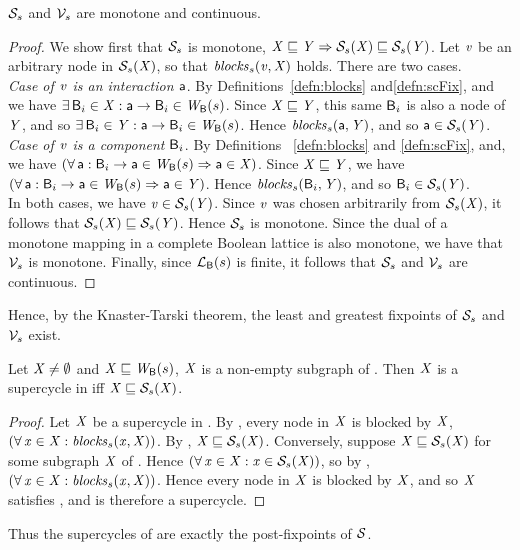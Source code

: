 \begin{proposition} \label{prop:monotone}
$\mathcal{S}_s$ and $\mathcal{V}_s$ are monotone and continuous.
\end{proposition}
%
\begin{proof}
We show first that $\mathcal{S}_s$ is monotone, \ie $\mathit{X} \sqsubseteq \mathit{Y} \Rightarrow \mathcal{S}_{s}(\mathit{X}) \sqsubseteq \mathcal{S}_{s}(\mathit{Y})$.
Let $\mathit{v}$ be an arbitrary node in $\mathcal{S}_{s}(\mathit{X})$, so that $\mathit{blocks}_{s}(\mathit{v}, \mathit{X})$ holds. There are two cases.\\

\emph{Case of $\mathit{v}$ is an interaction $\mathsf{a}$}. By Definitions~\ref{defn:blocks} and\ref{defn:scFix}, and  we have $\exists\, \mathsf{B}_i \in \mathit{X}  : \mathsf{a} \rightarrow \mathsf{B}_i \in \mathit{W}_{\mathsf{B}}({s})$.
Since $\mathit{X} \sqsubseteq \mathit{Y}$, this same $\mathsf{B}_i$ is also a node of $\mathit{Y}$, and so  $\exists\, \mathsf{B}_i \in \mathit{Y}  : \mathsf{a} \rightarrow \mathsf{B}_i \in \mathit{W}_{\mathsf{B}}({s})$. 
Hence  $\mathit{blocks}_{s}(\mathsf{a}, \mathit{Y})$, and so $\mathsf{a} \in \mathcal{S}_{s}(\mathit{Y})$. \\

\emph{Case of $\mathit{v}$ is a component $\mathsf{B}_i$}. By Definitions~ \ref{defn:blocks} and \ref{defn:scFix}, and, we have $(\forall\, \mathsf{a} : \mathsf{B}_i \rightarrow \mathsf{a} \in \mathit{W}_{\mathsf{B}}({s}) \Rightarrow \mathsf{a} \in \mathit{X})$.
Since $\mathit{X} \sqsubseteq \mathit{Y}$, we have  $(\forall\, \mathsf{a} : \mathsf{B}_i \rightarrow \mathsf{a} \in \mathit{W}_{\mathsf{B}}({s}) \Rightarrow \mathsf{a} \in \mathit{Y})$. 
Hence $\mathit{blocks}_{s}(\mathsf{B}_i, \mathit{Y})$, and so $\mathsf{B}_i \in \mathcal{S}_{s}(\mathit{Y})$. \\

In both cases, we have $\mathit{v} \in \mathcal{S}_{s}(\mathit{Y})$. Since $\mathit{v}$ was chosen arbitrarily from $\mathcal{S}_{s}(\mathit{X}) $, it follows that $\mathcal{S}_{s}(\mathit{X}) \sqsubseteq \mathcal{S}_{s}(\mathit{Y})$. Hence
$\mathcal{S}_s$ is monotone.
%
Since the dual of a monotone mapping in a complete Boolean lattice is also monotone, we have that $\mathcal{V}_s$ is monotone.
%
Finally, since $\mathcal{L}_{\mathsf{B}}({s})$ is finite, it follows that $\mathcal{S}_s$ and $\mathcal{V}_s$ are continuous.
\end{proof}

Hence, by the Knaster-Tarski theorem, the least and greatest fixpoints of $\mathcal{S}_s$ and $\mathcal{V}_s$ exist.

\begin{proposition} \label{prop:supercycleGFP}
Let $\mathit{X} \ne \emptyset$ and $\mathit{X} \sqsubseteq \mathit{W}_{\mathsf{B}}({s})$, \ie $\mathit{X}$ is a non-empty subgraph of . Then $\mathit{X}$ is a supercycle in  iff $\mathit{X} \sqsubseteq \mathcal{S}_{s}(\mathit{X})$.
\end{proposition}
%
\begin{proof}
Let $\mathit{X}$ be a supercycle in . By , every node in $\mathit{X}$ is blocked by $\mathit{X}$, \ie 
$(\forall\, \mathit{x} \in \mathit{X}: \mathit{blocks}_{s}(\mathit{x}, \mathit{X}))$. By , $\mathit{X} \sqsubseteq \mathcal{S}_{s}(\mathit{X})$.
%
Conversely, suppose $\mathit{X} \sqsubseteq \mathcal{S}_{s}(\mathit{X})$ for some subgraph $\mathit{X}$ of . Hence 
$(\forall\, \mathit{x} \in \mathit{X}: \mathit{x} \in \mathcal{S}_{s}(\mathit{X}))$, so by , $(\forall\, \mathit{x} \in \mathit{X}: \mathit{blocks}_{s}(\mathit{x}, \mathit{X}))$.
Hence every node in $\mathit{X}$ is blocked by $\mathit{X}$, and so $\mathit{X}$ satisfies , and is therefore a supercycle.
\end{proof}
%
Thus the supercycles of  are exactly the post-fixpoints of $\mathcal{S}$. %


